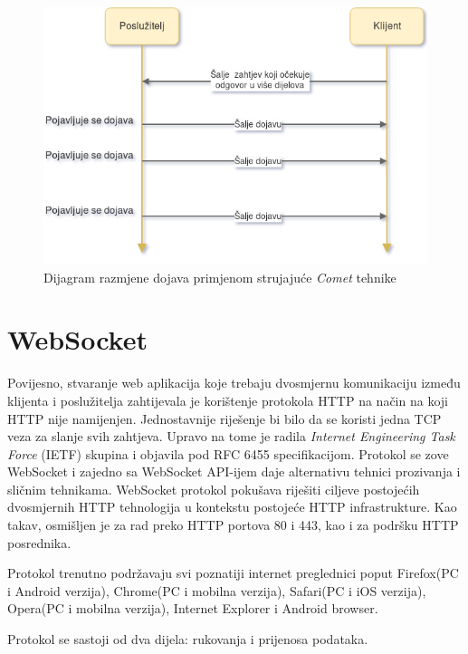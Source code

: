 \documentclass[times, utf8, zavrsni]{fer}
\begin{document}
\begin{figure}[htb]
\centering
\includegraphics[width=14cm]{img/streaming.png}
\caption{Dijagram razmjene dojava primjenom strujajuće {\em Comet} tehnike}
\label{fig:streaming-image}
\end{figure}

\section{WebSocket}
Povijesno, stvaranje web aplikacija koje trebaju dvosmjernu komunikaciju između klijenta i poslužitelja zahtijevala je korištenje protokola HTTP na način na koji HTTP nije namijenjen. Jednostavnije riješenje bi bilo da se koristi jedna TCP veza za slanje svih zahtjeva. Upravo na tome je radila {\em Internet Engineering Task Force} (IETF) skupina i objavila pod RFC 6455 specifikacijom. Protokol se zove WebSocket i zajedno sa WebSocket API-ijem daje alternativu tehnici prozivanja i sličnim tehnikama. WebSocket protokol pokušava riješiti ciljeve postojećih dvosmjernih HTTP tehnologija u kontekstu postojeće HTTP infrastrukture. Kao takav, osmišljen je za rad preko HTTP portova 80 i 443, kao i za podršku HTTP posrednika.

Protokol trenutno podržavaju svi poznatiji internet preglednici poput Firefox(PC i Android verzija), Chrome(PC i mobilna verzija), Safari(PC i iOS verzija), Opera(PC i mobilna verzija), Internet Explorer i Android browser.

Protokol se sastoji od dva dijela: rukovanja i prijenosa podataka. \citep{rfc6455}
\end{document}
